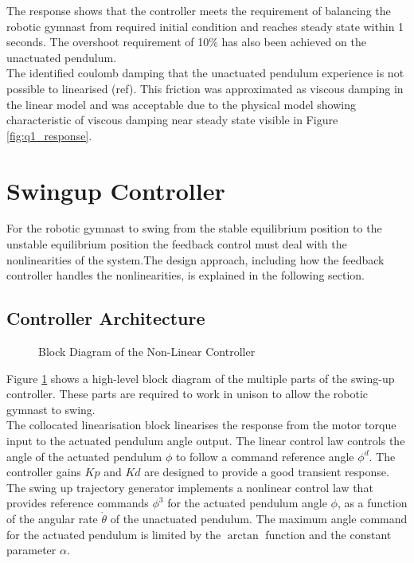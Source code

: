 The response shows that the controller meets the requirement of balancing the robotic gymnast from required initial condition and reaches steady state within 1 seconds. The overshoot requirement of 10\% has also been achieved on the unactuated pendulum.\\

The identified coulomb damping that the unactuated pendulum experience is not possible to linearised (ref). This friction was approximated as viscous damping in the linear model and was acceptable due to the physical model showing characteristic of viscous damping near steady state visible in Figure \ref{fig:q1_response}.



\section{Swingup Controller}
For the robotic gymnast to swing from the stable equilibrium position to the unstable equilibrium position the feedback control must deal with the nonlinearities of the system.The design approach, including how the feedback controller handles the nonlinearities, is explained in the following section.

\subsection{Controller Architecture}
\begin{figure}[h]
	\centering
	
	\caption{Block Diagram of the Non-Linear Controller}
	\label{fig:nonlinear_controller_arch}
\end{figure}
Figure \ref{fig:nonlinear_controller_arch} shows a high-level block diagram of the multiple parts of the swing-up controller. These parts are required to work in unison to allow the robotic gymnast to swing.\\


The collocated linearisation block linearises the response from the motor torque input to the actuated pendulum angle output. The linear control law controls the angle of the actuated pendulum $\phi$ to follow a command reference angle ${\phi}^d$. The controller gains $Kp$ and $Kd$ are designed to provide a good transient response. The swing up trajectory generator implements a nonlinear control law that provides reference commands $\phi^3$ for the actuated pendulum angle $\phi$, as a function of the angular rate $\dot{\theta}$ of the unactuated pendulum. The maximum angle command for the actuated pendulum is limited by the $\arctan$ function and the constant parameter $\alpha$.\\\

